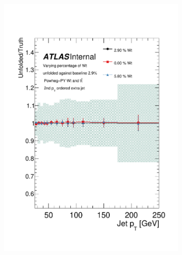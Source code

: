 \begin{figure}
\begin{subfigure}[]{0.3\textwidth}
\includegraphics[width=\textwidth]{fig/Wt/TruthRatioJet1.pdf}
\end{subfigure}
~
\begin{subfigure}[]{0.3\textwidth}

\end{subfigure}
\end{figure}
